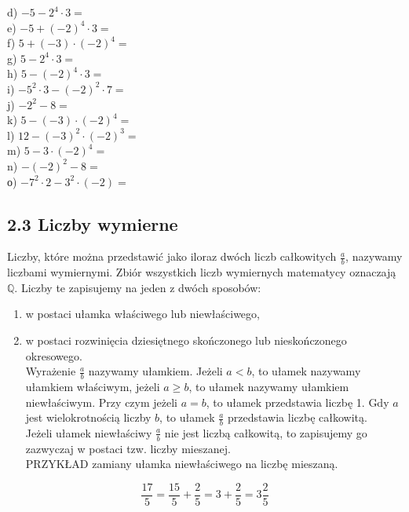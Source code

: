 \documentclass[10pt]{article}
\begin{document}
\begin{enumerate}
d) \(-5-2^{4} \cdot 3=\)\\
e) \(-5+(-2)^{4} \cdot 3=\)\\
f) \(5+(-3) \cdot(-2)^{4}=\)\\
g) \(5-2^{4} \cdot 3=\)\\
h) \(5-(-2)^{4} \cdot 3=\)\\
i) \(-5^{2} \cdot 3-(-2)^{2} \cdot 7=\)\\
j) \(-2^{2}-8=\)\\
k) \(5-(-3) \cdot(-2)^{4}=\)\\
l) \(12-(-3)^{2} \cdot(-2)^{3}=\)\\
m) \(5-3 \cdot(-2)^{4}=\)\\
n) \(-(-2)^{2}-8=\)\\
о) \(-7^{2} \cdot 2-3^{2} \cdot(-2)=\)
\end{enumerate}

\subsection*{2.3 Liczby wymierne}
Liczby, które można przedstawić jako iloraz dwóch liczb całkowitych \(\frac{a}{b}\), nazywamy liczbami wymiernymi. Zbiór wszystkich liczb wymiernych matematycy oznaczają \(\mathbb{Q}\). Liczby te zapisujemy na jeden z dwóch sposobów:

\begin{enumerate}
  \item w postaci ułamka właściwego lub niewłaściwego,
  \item w postaci rozwinięcia dziesiętnego skończonego lub nieskończonego okresowego.\\
Wyrażenie \(\frac{a}{b}\) nazywamy ułamkiem. Jeżeli \(a<b\), to ułamek nazywamy ułamkiem właściwym, jeżeli \(a \geqslant b\), to ułamek nazywamy ułamkiem niewłaściwym. Przy czym jeżeli \(a=b\), to ułamek przedstawia liczbę 1. Gdy \(a\) jest wielokrotnością liczby \(b\), to ułamek \(\frac{a}{b}\) przedstawia liczbę całkowitą.\\
Jeżeli ułamek niewłaściwy \(\frac{a}{b}\) nie jest liczbą całkowitą, to zapisujemy go zazwyczaj w postaci tzw. liczby mieszanej.\\
PRZYKŁAD zamiany ułamka niewłaściwego na liczbę mieszaną.
\end{enumerate}

\[
\frac{17}{5}=\frac{15}{5}+\frac{2}{5}=3+\frac{2}{5}=3 \frac{2}{5}
\]
\end{document}
